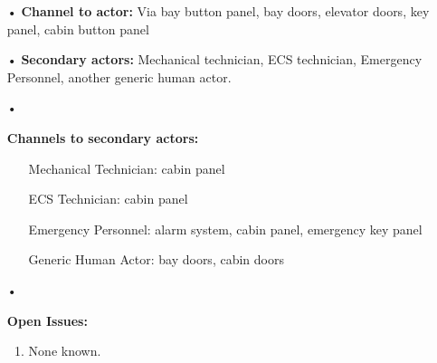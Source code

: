 \documentclass[12pt]{article}
\begin{document}
\begin{itemize}
			\item[•] \textbf{Channel to actor:} Via bay button panel, bay doors, elevator doors, key panel, cabin button panel 
			\item[•] \textbf{Secondary actors:} Mechanical technician, ECS technician, Emergency Personnel, another 
			generic human actor.
			\item[•]{\textbf{Channels to secondary actors:}
			    \begin{itemize}
			    	\item[] Mechanical Technician: cabin panel
					\item[] ECS Technician: cabin panel
					\item[] Emergency Personnel: alarm system, cabin panel, emergency key panel
					\item[] Generic Human Actor: bay doors, cabin doors
			    \end{itemize}}
			\item[•]{\textbf{Open Issues:}
				\begin{enumerate}
					\item None known.
				\end{enumerate}}
		\end{itemize}
\end{document}
